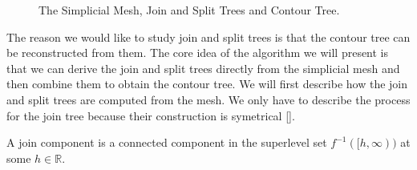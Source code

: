 \begin{figure}[h]
    \caption{The Simplicial Mesh, Join and Split Trees and Contour Tree.}%
    \label{fig:mesh-join-split-contour}%
\end{figure}

The reason we would like to study join and split trees is that the contour tree can be reconstructed from them. The core idea of the algorithm we will present is that we can derive the join and split trees directly from the simplicial mesh and then combine them to obtain the contour tree. We will first describe how the join and split trees are computed from the mesh. We only have to describe the process for the join tree because their construction is symetrical [].

\begin{defn} A join component is a connected component in the superlevel set $f^{-1}([h, \infty))$ at some $h \in \mathbb{R}$.  \end{defn}

